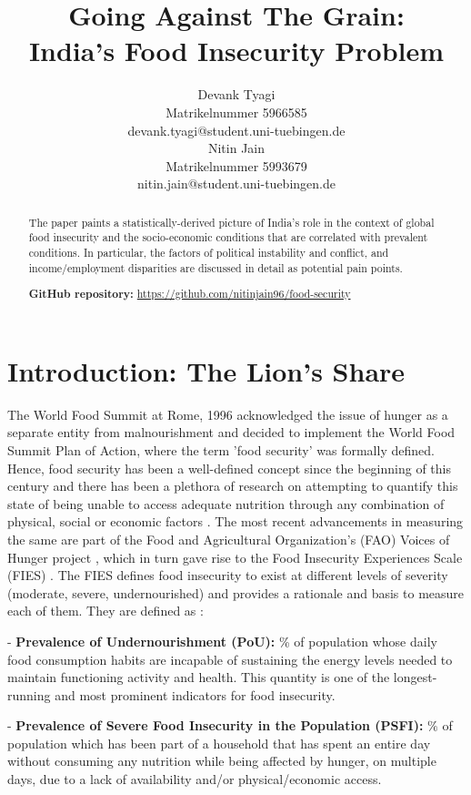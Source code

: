 \documentclass{article}
\title{Going Against The Grain:\\India's Food Insecurity Problem}
\author{%
  Devank Tyagi \\
  Matrikelnummer 5966585\\
  devank.tyagi@student.uni-tuebingen.de\\
   \And
   Nitin Jain \\
   Matrikelnummer 5993679 \\
   nitin.jain@student.uni-tuebingen.de \\
}
\begin{document}
\maketitle

\begin{abstract}
  The paper paints a statistically-derived picture of India's role in the context of global food insecurity and the socio-economic conditions that are correlated with prevalent conditions. In particular, the factors of political instability and conflict, and income/employment disparities are discussed in detail as potential pain points.
  
  \textbf{GitHub repository:} \url{https://github.com/nitinjain96/food-security}
\end{abstract}

\section{Introduction: The Lion's Share}

The World Food Summit at Rome, 1996 \cite{rome1996} acknowledged the issue of hunger as a separate entity from malnourishment and decided to implement the World Food Summit Plan of Action, where the term 'food security' was formally defined. Hence, food security has been a well-defined concept since the beginning of this century and there has been a plethora of research on attempting to quantify this state of being unable to access adequate nutrition through any combination of physical, social or economic factors \cite{rome1996}. The most recent advancements in measuring the same are part of the Food and Agricultural Organization's (FAO) Voices of Hunger project \cite{cafiero}, which in turn gave rise to the Food Insecurity Experiences Scale (FIES) \cite{cafiero}. The FIES defines food insecurity to exist at different levels of severity (moderate, severe, undernourished) and provides a rationale and basis to measure each of them. They are defined as \cite{index_exp}:

- \textbf{Prevalence of Undernourishment (PoU):} \% of population whose daily food consumption habits are incapable of sustaining the energy levels needed to maintain functioning activity and health. This quantity is one of the longest-running and most prominent indicators for food insecurity.

- \textbf{Prevalence of Severe Food Insecurity in the Population (PSFI):} $\%$ of population which has been part of a household that has spent an entire day without consuming any nutrition while being affected by hunger, on multiple days, due to a lack of availability and/or physical/economic access.
\end{document}
